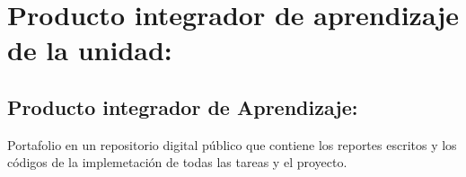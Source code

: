 \section{Producto integrador de aprendizaje de la unidad:}

\subsection{Producto integrador de Aprendizaje:}

\quad

Portafolio en un repositorio digital p\'{u}blico que contiene los
reportes escritos y los c\'{o}digos de la implemetaci\'{o}n de todas las
tareas y el proyecto.

